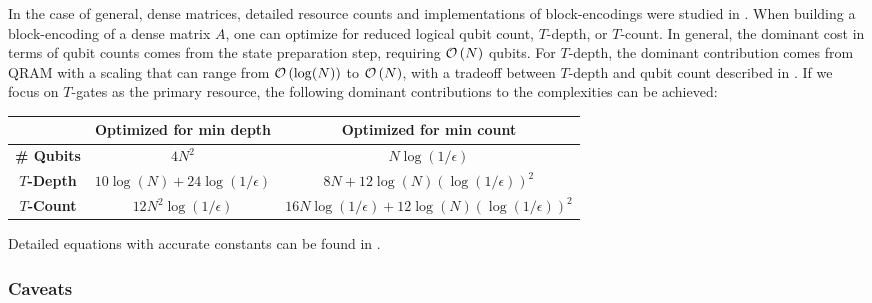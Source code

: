 \begin{refsection}
In the case of general, dense matrices,  detailed resource counts and implementations of block-encodings were studied in \cite{clader2022resourcesForBlockEncoding}. When building a block-encoding of a dense matrix $A$, one can optimize for reduced logical qubit count, $T$-depth, or $T$-count. In general, the dominant cost in terms of qubit counts comes from the state preparation step, requiring $\mathcal{O}\left( N \right)$ qubits. For $T$-depth, the dominant contribution comes from QRAM with a scaling that can range from $\mathcal{O}\left( \log(N) \right)$ to $\mathcal{O}\left( N \right)$, with a tradeoff between $T$-depth and qubit count described in \cite{low2018tradingTgatesforDirtyQubits}. If we focus on $T$-gates as the primary resource, the following dominant contributions to the complexities can be achieved:

\begin{center} \noindent\begin{tabular}{c||c|c}
 & \textbf{Optimized for min depth} & \textbf{Optimized for min count}\\
\hline
\hline
\textbf{\# Qubits} & $4 N^2$ & $N\log(1/\epsilon)$\\ 
\hline  
\textbf{$T$-Depth} & $10\log(N)+24\log(1/\epsilon)$ & $8 N + 12 \log(N) (\log(1/\epsilon))^2$ \\
\hline
\textbf{$T$-Count} & $12N^2\log(1/\epsilon) $ & $16N\log(1/\epsilon) + 12 \log(N) (\log(1/\epsilon))^2$\\
\end{tabular}
\end{center}

\noindent Detailed equations with accurate constants can be found in \cite{clader2022resourcesForBlockEncoding}.


\subsubsection*{Caveats}


\end{refsection}
